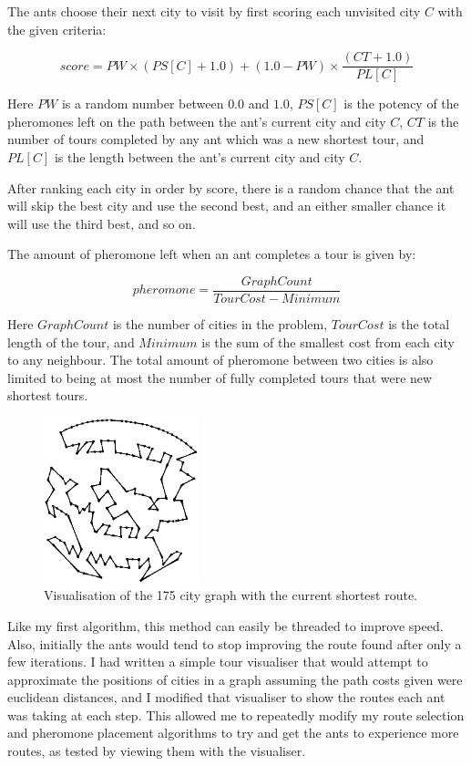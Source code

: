\documentclass[a4paper,11pt]{article}
\begin{document}
The ants choose their next city to visit by first scoring each unvisited city
$C$ with the given criteria:

$$score = PW \times (PS[C] + 1.0)+(1.0 - PW) \times \frac{(CT + 1.0)}{PL[C]}$$

Here $PW$ is a random number between $0.0$ and $1.0$,
$PS[C]$ is the potency of the pheromones left on the path between
the ant's current city and city $C$, $CT$ is the number of tours
completed by any ant which was a new shortest tour, and $PL[C]$ is the
length between the ant's current city and city $C$.

After ranking each city in order by score, there is a random chance that the
ant will skip the best city and use the second best, and an either smaller
chance it will use the third best, and so on.

The amount of pheromone left when an ant completes a tour is given by:

$$pheromone = \frac{GraphCount}{TourCost - Minimum}$$

Here $GraphCount$ is the number of cities in the problem, $TourCost$ is the
total length of the tour, and $Minimum$ is the sum of the smallest cost from
each city to any neighbour. The total amount of pheromone between two cities is
also limited to being at most the number of fully completed tours that were new
shortest tours.

\begin{figure}
\includegraphics[width=0.4\textwidth]{175vis}
\caption{Visualisation of the 175 city graph with the current shortest route.}
\end{figure}

Like my first algorithm, this method can easily be threaded to improve speed.
Also, initially the ants would tend to stop improving the route found after
only a few iterations. I had written a simple tour visualiser that would
attempt to approximate the positions of cities in a graph assuming the path
costs given were euclidean distances, and I modified that visualiser to show
the routes each ant was taking at each step. This allowed me to repeatedly
modify my route selection and pheromone placement algorithms to try and get
the ants to experience more routes, as tested by viewing them with the
visualiser.
\end{document}
